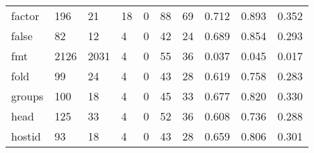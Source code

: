 \begin{longtable}{lp{2.0cm}p{2.0cm}p{2.0cm}p{2.0cm}p{2.0cm}p{2.0cm}p{2.0cm}p{2.0cm}p{2.0cm}}
factor    &                    196 &                                 21 &                                18 &                                0 &                                88 &                              69 &                                0.712 &                                  0.893 &                                0.352 \\
false     &                     82 &                                 12 &                                 4 &                                0 &                                42 &                              24 &                                0.689 &                                  0.854 &                                0.293 \\
fmt       &                   2126 &                               2031 &                                 4 &                                0 &                                55 &                              36 &                                0.037 &                                  0.045 &                                0.017 \\
fold      &                     99 &                                 24 &                                 4 &                                0 &                                43 &                              28 &                                0.619 &                                  0.758 &                                0.283 \\
groups    &                    100 &                                 18 &                                 4 &                                0 &                                45 &                              33 &                                0.677 &                                  0.820 &                                0.330 \\
head      &                    125 &                                 33 &                                 4 &                                0 &                                52 &                              36 &                                0.608 &                                  0.736 &                                0.288 \\
hostid    &                     93 &                                 18 &                                 4 &                                0 &                                43 &                              28 &                                0.659 &                                  0.806 &                                0.301 \\

\end{longtable}
